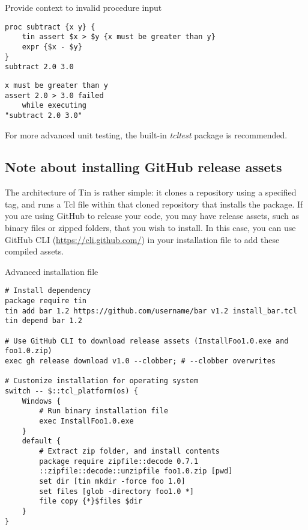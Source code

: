 \documentclass{article}
\begin{document}
\begin{example}{Provide context to invalid procedure input}
\begin{lstlisting}
proc subtract {x y} {
    tin assert $x > $y {x must be greater than y}
    expr {$x - $y}
}
subtract 2.0 3.0
\end{lstlisting} 
\tcblower
\begin{lstlisting}
x must be greater than y
assert 2.0 > 3.0 failed
    while executing
"subtract 2.0 3.0"
\end{lstlisting}
\end{example}
For more advanced unit testing, the built-in \textit{tcltest} package is recommended.
\clearpage
\subsection{Note about installing GitHub release assets}
The architecture of Tin is rather simple: it clones a repository using a specified tag, and runs a Tcl file within that cloned repository that installs the package.
If you are using GitHub to release your code, you may have release assets, such as binary files or zipped folders, that you wish to install. 
In this case, you can use GitHub CLI (\url{https://cli.github.com/}) in your installation file to add these compiled assets.

\begin{example}{Advanced installation file}
\begin{lstlisting} 
# Install dependency
package require tin
tin add bar 1.2 https://github.com/username/bar v1.2 install_bar.tcl
tin depend bar 1.2

# Use GitHub CLI to download release assets (InstallFoo1.0.exe and foo1.0.zip)
exec gh release download v1.0 --clobber; # --clobber overwrites

# Customize installation for operating system
switch -- $::tcl_platform(os) {
    Windows {
        # Run binary installation file
        exec InstallFoo1.0.exe
    }
    default {
        # Extract zip folder, and install contents
        package require zipfile::decode 0.7.1
        ::zipfile::decode::unzipfile foo1.0.zip [pwd]
        set dir [tin mkdir -force foo 1.0]
        set files [glob -directory foo1.0 *]
        file copy {*}$files $dir
    }
}
\end{lstlisting}
\end{example}

\clearpage

\printindex
\end{document}
